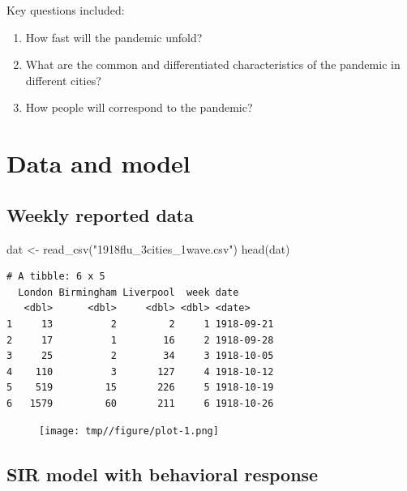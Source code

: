 \documentclass[
  letterpaper,
  DIV=11,
  numbers=noendperiod]{scrartcl}
\newenvironment{Shaded}{\begin{snugshade}}{\end{snugshade}}
\newcommand{\FunctionTok}[1]{\textcolor[rgb]{0.28,0.35,0.67}{#1}}
\newcommand{\NormalTok}[1]{\textcolor[rgb]{0.00,0.23,0.31}{#1}}
\newcommand{\OtherTok}[1]{\textcolor[rgb]{0.00,0.23,0.31}{#1}}
\newcommand{\StringTok}[1]{\textcolor[rgb]{0.13,0.47,0.30}{#1}}
\providecommand{\tightlist}{%
  \setlength{\itemsep}{0pt}\setlength{\parskip}{0pt}}\usepackage{longtable,booktabs,array}
\begin{document}
\framebreak

Key questions included:

\begin{enumerate}
\def\labelenumi{\arabic{enumi}.}
\tightlist
\item
  How fast will the pandemic unfold?
\item
  What are the common and differentiated characteristics of the pandemic
  in different cities?
\item
  How people will correspond to the pandemic?
\end{enumerate}

\hypertarget{data-and-model}{%
\section{Data and model}\label{data-and-model}}

\hypertarget{weekly-reported-data}{%
\subsection{Weekly reported data}\label{weekly-reported-data}}

\begin{Shaded}
\begin{Highlighting}[]
\NormalTok{dat }\OtherTok{\textless{}{-}} \FunctionTok{read\_csv}\NormalTok{(}\StringTok{"1918flu\_3cities\_1wave.csv"}\NormalTok{)}
\FunctionTok{head}\NormalTok{(dat)}
\end{Highlighting}
\end{Shaded}

\begin{verbatim}
# A tibble: 6 x 5
  London Birmingham Liverpool  week date      
   <dbl>      <dbl>     <dbl> <dbl> <date>    
1     13          2         2     1 1918-09-21
2     17          1        16     2 1918-09-28
3     25          2        34     3 1918-10-05
4    110          3       127     4 1918-10-12
5    519         15       226     5 1918-10-19
6   1579         60       211     6 1918-10-26
\end{verbatim}

\framebreak

\begin{figure}[h!]

{\centering \texttt{[image: tmp//figure/plot-1.png]}

}

\end{figure}

\hypertarget{sir-model-with-behavioral-response}{%
\subsection{SIR model with behavioral
response}\label{sir-model-with-behavioral-response}}
\end{document}
